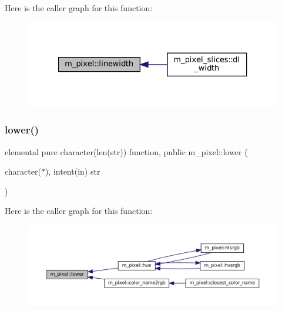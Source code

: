 Here is the caller graph for this function\+:
\nopagebreak
\begin{figure}[H]
\begin{center}
\leavevmode
\includegraphics[width=327pt]{namespacem__pixel_a16379e283aaa99e2e0ba1eb26e93452d_icgraph}
\end{center}
\end{figure}
\mbox{\label{namespacem__pixel_a7b4934756a8325a19fee6653c4cbf6af}} 
\subsubsection{\texorpdfstring{lower()}{lower()}}
{\footnotesize\ttfamily elemental pure character(len(str)) function, public m\+\_\+pixel\+::lower (\begin{DoxyParamCaption}\item[{character($\ast$), intent(in)}]{str }\end{DoxyParamCaption})}

Here is the caller graph for this function\+:
\nopagebreak
\begin{figure}[H]
\begin{center}
\leavevmode
\includegraphics[width=350pt]{namespacem__pixel_a7b4934756a8325a19fee6653c4cbf6af_icgraph}
\end{center}
\end{figure}
\mbox{\label{namespacem__pixel_ab7128437f95b40004bf73fc6e3f597f8}} 
